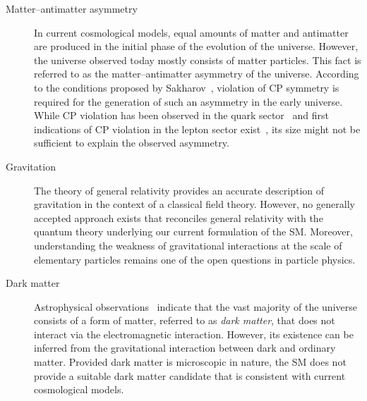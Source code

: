 \begin{description}

\item[Matter--antimatter asymmetry] In current cosmological models, equal amounts
  of matter and antimatter are produced in the initial phase of the evolution of
  the universe. However, the universe observed today mostly consists of matter
  particles. This fact is referred to as the matter--antimatter asymmetry of the
  universe. According to the conditions proposed by
  Sakharov~\cite{Sakharov:1967dj}, violation of CP symmetry is required for the
  generation of such an asymmetry in the early universe. While CP violation has
  been observed in the quark sector~\cite{Christenson:1964fg} and first
  indications of CP violation in the lepton sector exist~\cite{T2K:2019bcf}, its
  size might not be sufficient to explain the observed asymmetry.

\item[Gravitation] The theory of general relativity provides an accurate
  description of gravitation in the context of a classical field
  theory. However, no generally accepted approach exists that reconciles general
  relativity with the quantum theory underlying our current formulation of the
  SM. Moreover, understanding the weakness of gravitational interactions at the
  scale of elementary particles remains one of the open questions in particle
  physics.

\item[Dark matter] Astrophysical
  observations~\cite{Zwicky:1933gu,Zwicky:1937zza,Rubin:1970zza,Rubin:1980zd,Clowe:2006eq}
  indicate that the vast majority of the universe consists of a form of matter,
  referred to as \emph{dark matter}, that does not interact via the
  electromagnetic interaction. However, its existence can be inferred from the
  gravitational interaction between dark and ordinary matter. Provided dark
  matter is microscopic in nature, the SM does not provide a suitable dark
  matter candidate that is consistent with current cosmological models.


\end{description}
